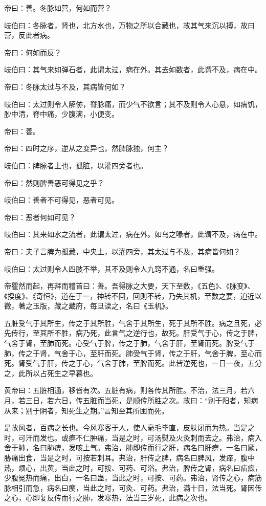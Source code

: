 \documentclass{article}%
\begin{document}
帝曰：善。冬脉如营，何如而营？

岐伯曰：冬脉者，肾也，北方水也，万物之所以合藏也，故其气来沉以搏，故曰营，反此者病。

帝曰：何如而反？

岐伯曰：其气来如弹石者，此谓太过，病在外。其去如数者，此谓不及，病在中。

帝曰：冬脉太过与不及，其病皆何如？

岐伯曰：太过则令人解㑊，脊脉痛，而少气不欲言；其不及则令人心悬，如病饥，䏚中清，脊中痛，少腹满，小便变。

帝曰：善。

帝曰：四时之序，逆从之变异也，然脾脉独，何主？

岐伯曰：脾脉者土也，孤脏，以灌四旁者也。

帝曰：然则脾善恶可得见之乎？

岐伯曰：善者不可得见，恶者可见。

帝曰：恶者何如可见？

岐伯曰：其来如水之流者，此谓太过，病在外。如乌之喙者，此谓不及，病在中。

帝曰：夫子言脾为孤藏，中央土，以灌四旁，其太过与不及，其病皆何如？

岐伯曰：太过则令人四肢不举，其不及则令人九窍不通，名曰重强。

帝瞿然而起，再拜而稽首曰：善。吾得脉之大要，天下至数，《五色》、《脉变》、《揆度》、《奇恒》，道在于一，神转不回，回则不转，乃失其机，至数之要，迫近以微，著之玉版，藏之藏府，每旦读之，名曰《玉机》。

五脏受气于其所生，传之于其所胜，气舍于其所生，死于其所不胜。病之且死，必先传行，至其所不胜，病乃死，此言气之逆行也，故死。肝受气于心，传之于脾，气舍于肾，至肺而死。心受气于脾，传之于肺，气舍于肝，至肾而死。脾受气于肺，传之于肾，气舍于心，至肝而死。肺受气于肾，传之于肝，气舍于脾，至心而死。肾受气于肝，传之于心，气舍于肺，至脾而死。此皆逆死也，一日一夜，五分之，此所以占死生之早暮也。

黄帝曰：五脏相通，移皆有次。五脏有病，则各传其所胜。不治，法三月，若六月，若三日，若六日，传五脏而当死，是顺传所胜之次。故曰：“别于阳者，知病从来；别于阴者，知死生之期。”言知至其所困而死。

是故风者，百病之长也。今风寒客于人，使人毫毛毕直，皮肤闭而为热。当是之时，可汗而发也。或痹不仁肿痛，当是之时，可汤熨及火灸刺而去之。弗治，病入舍于肺，名曰肺痹，发咳上气。弗治，肺即传而行之肝，病名曰肝痹，一名曰厥，胁痛出食，当是之时，可按若刺耳。弗治，肝传之脾，病名曰脾风，发瘅，腹中热，烦心，出黄，当此之时，可按、可药、可浴。弗治，脾传之肾，病名曰疝瘕，少腹冤热而痛，出白，一名曰蛊，当此之时，可按、可药。弗治，肾传之心，病筋脉相引而急，病名曰瘈，当此之时，可灸、可药。弗治，满十日，法当死。肾因传之心，心即复反传而行之肺，发寒热，法当三岁死，此病之次也。
\end{document}
